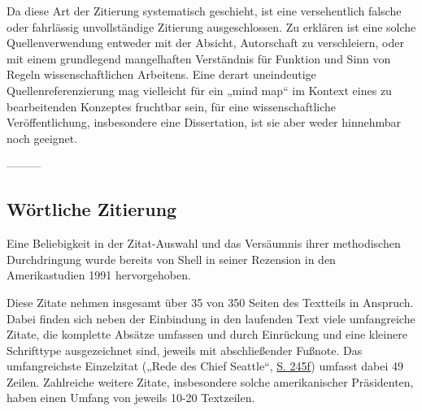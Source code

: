 \documentclass[ngerman,final,fontsize=12pt,paper=a4,twoside,bibliography=totoc,BCOR=8mm,draft=false]{scrartcl}
\begin{document}

Da diese Art der Zitierung systematisch geschieht, ist eine versehentlich falsche oder fahrlässig unvollständige Zitierung ausgeschlossen. Zu erklären ist eine solche Quellenverwendung entweder mit der Absicht, Autorschaft zu verschleiern, oder mit einem grundlegend mangelhaften Verständnis für Funktion und Sinn von Regeln wissenschaftlichen Arbeitens. Eine derart uneindeutige Quellenreferenzierung mag vielleicht für ein „mind map“ im Kontext eines zu bearbeitenden Konzeptes fruchtbar sein, für eine wissenschaftliche Veröffentlichung, insbesondere eine Dissertation, ist sie aber weder hinnehmbar noch geeignet. 


--------- 

\subsection{%
 Wörtliche Zitierung }

Eine Beliebigkeit in der Zitat-Auswahl und das Versäumnis ihrer methodischen Durchdringung wurde bereits von Shell in seiner Rezension in den Amerikastudien 1991 hervorgehoben. 


Diese Zitate nehmen insgesamt über 35 von 350 Seiten des Textteils in Anspruch. Dabei finden sich neben der Einbindung in den laufenden Text viele umfangreiche Zitate, die komplette Absätze umfassen und durch Einrückung und eine kleinere Schrifttype ausgezeichnet sind, jeweils mit abschließender Fußnote. Das umfangreichste Einzelzitat („Rede des Chief Seattle“, %
\href{http://de.vroniplag.wikia.com/wiki/Mm/Mathiopoulos-1987/245}{S. 245f}) umfasst dabei 49 Zeilen. Zahlreiche weitere Zitate, insbesondere solche amerikanischer Präsidenten, haben einen Umfang von jeweils 10-20 Textzeilen. 
\end{document}
